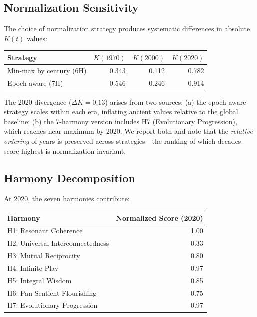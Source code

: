 \documentclass[10pt,letterpaper]{article}
\newcommand{\kt}{$K(t)$}
\begin{document}
\subsection*{Normalization Sensitivity}

The choice of normalization strategy produces systematic differences
in absolute \kt{} values:

\begin{center}
\begin{tabular}{lrrr}
\toprule
Strategy & $K(1970)$ & $K(2000)$ & $K(2020)$ \\
\midrule
Min-max by century (6H) & 0.343 & 0.112 & 0.782 \\
Epoch-aware (7H) & 0.546 & 0.246 & 0.914 \\
\bottomrule
\end{tabular}
\end{center}

The 2020 divergence ($\Delta K = 0.13$) arises from two sources:
(a) the epoch-aware strategy scales within each era, inflating ancient
values relative to the global baseline; (b) the 7-harmony version
includes H7 (Evolutionary Progression), which reaches near-maximum by
2020. We report both and note that the \emph{relative ordering} of
years is preserved across strategies---the ranking of which decades
score highest is normalization-invariant.

\subsection*{Harmony Decomposition}

At 2020, the seven harmonies contribute:

\begin{center}
\begin{tabular}{lr}
\toprule
Harmony & Normalized Score (2020) \\
\midrule
H1: Resonant Coherence & 1.00 \\
H2: Universal Interconnectedness & 0.33 \\
H3: Mutual Reciprocity & 0.80 \\
H4: Infinite Play & 0.97 \\
H5: Integral Wisdom & 0.85 \\
H6: Pan-Sentient Flourishing & 0.75 \\
H7: Evolutionary Progression & 0.97 \\
\bottomrule
\end{tabular}
\end{center}
\end{document}
